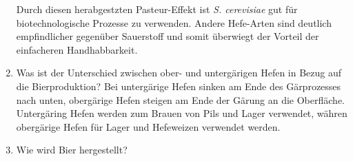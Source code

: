 \begin{enumerate}
		Durch diesen herabgestzten Pasteur-Effekt ist \emph{S. cerevisiae} gut für biotechnologische Prozesse zu verwenden.
		Andere Hefe-Arten sind deutlich empfindlicher gegenüber Sauerstoff
		und somit überwiegt der Vorteil der einfacheren Handhabbarkeit.
			
	\item Was ist der Unterschied zwischen ober- und untergärigen Hefen in Bezug auf die Bierproduktion?
	\label{item:oberuntergaerig}
		Bei untergärige Hefen sinken am Ende des Gärprozesses nach unten,
		obergärige Hefen steigen am Ende der Gärung an die Oberfläche.
		Untergäring Hefen werden zum Brauen von Pils und Lager verwendet,
		währen obergärige Hefen für Lager und Hefeweizen verwendet werden.

	\item Wie wird Bier hergestellt?


\end{enumerate}
